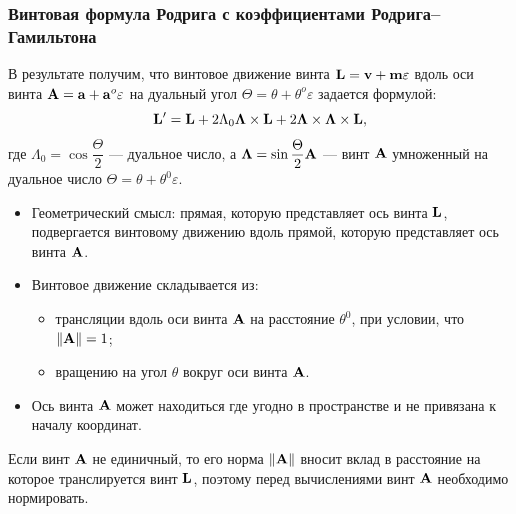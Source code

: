 \begin{frame}
  \frametitle{Винтовая формула Родрига с коэффициентами Родрига--Гамильтона}
  В результате получим, что винтовое движение винта $\vb{L} = \vb{v} + \vb{m}\varepsilon$ вдоль оси винта $\vb{A} = \vb{a} + \vb{a}^o\varepsilon$ на дуальный угол $\Theta = \theta + \theta^o\varepsilon$ задается формулой:
  \begin{equation*}
    \vb{L}^{\prime} = \vb{L} + 2\Lambda_0 \vb{\Lambda}\times\vb{L} + 2\vb{\Lambda}\times\vb{\Lambda}\times\vb{L},
  \end{equation*}
  где $\Lambda_0 = \cos\dfrac{\Theta}{2}$ --- дуальное число, а $\vb{\Lambda} = \sin\dfrac{\Theta}{2}\vb{A}$ --- винт $\vb{A}$ умноженный на дуальное число $\Theta = \theta + \theta^0\varepsilon$.
  \begin{itemize}
    \item Геометрический смысл: прямая, которую представляет ось винта $\vb{L}$, подвергается винтовому движению вдоль прямой, которую представляет ось винта $\vb{A}$.
    \item Винтовое движение складывается из:
    \begin{itemize}
      \item трансляции вдоль оси винта $\vb{A}$ на расстояние $\theta^0$, при условии, что $\norm{\vb{A}}=1$;
      \item вращению на угол $\theta$ вокруг оси винта $\vb{A}$.
    \end{itemize}
    \item Ось винта $\vb{A}$ может находиться где угодно в пространстве и не привязана к началу координат.
  \end{itemize}
  Если винт $\vb{A}$ не единичный, то его норма $\norm{\vb{A}}$ вносит вклад в расстояние на которое транслируется винт $\vb{L}$, поэтому перед вычислениями винт $\vb{A}$ необходимо нормировать. 
\end{frame}
